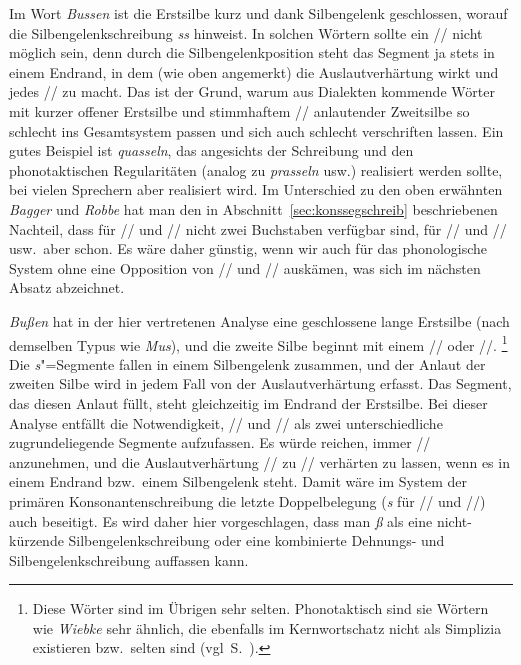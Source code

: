 Im Wort \textit{Bussen} ist die Erstsilbe kurz und dank Silbengelenk geschlossen, worauf die Silbengelenkschreibung \textit{ss} hinweist.
In solchen Wörtern sollte ein // nicht möglich sein, denn durch die Silbengelenkposition steht das Segment ja stets in einem Endrand, in dem (wie oben angemerkt) die Auslautverhärtung wirkt und jedes // zu \textipa{[s]} macht.
Das ist der Grund, warum aus Dialekten kommende Wörter mit kurzer offener Erstsilbe und stimmhaftem // anlautender Zweitsilbe so schlecht ins Gesamtsystem passen und sich auch schlecht verschriften lassen.
Ein gutes Beispiel ist \textit{quasseln}, das angesichts der Schreibung und den phonotaktischen Regularitäten (analog zu \textit{prasseln} usw.) \textipa{[kvas@ln]} realisiert werden sollte, bei vielen Sprechern aber \textipa{[kvaz@ln]} realisiert wird.
Im Unterschied zu den oben erwähnten \textit{Bagger} und \textit{Robbe} hat man den in Abschnitt~\ref{sec:konssegschreib} beschriebenen Nachteil, dass für // und // nicht zwei Buchstaben verfügbar sind, für // und // usw.\ aber schon.
Es wäre daher günstig, wenn wir auch für das phonologische System ohne eine Opposition von // und // auskämen, was sich im nächsten Absatz abzeichnet.

\textit{Bußen} hat in der hier vertretenen Analyse eine geschlossene lange Erstsilbe (nach demselben Typus wie \textit{Mus}), und die zweite Silbe beginnt mit einem // oder //.%
\footnote{Diese Wörter sind im Übrigen sehr selten.
Phonotaktisch sind sie Wörtern wie \textit{Wiebke} sehr ähnlich, die ebenfalls im Kernwortschatz nicht als Simplizia existieren bzw.\ selten sind (vgl\ S.~\pageref{abs:wiebke}).}
Die \textit{s}"=Segmente fallen in einem Silbengelenk zusammen, und der Anlaut der zweiten Silbe wird in jedem Fall von der Auslautverhärtung erfasst.
Das Segment, das diesen Anlaut füllt, steht gleichzeitig im Endrand der Erstsilbe.
Bei dieser Analyse entfällt die Notwendigkeit, // und // als zwei unterschiedliche zugrundeliegende Segmente aufzufassen.
Es würde reichen, immer // anzunehmen, und die Auslautverhärtung // zu // verhärten zu lassen, wenn es in einem Endrand bzw.\ einem Silbengelenk steht.
Damit wäre im System der primären Konsonantenschreibung die letzte Doppelbelegung (\textit{s} für // und //) auch beseitigt.
Es wird daher hier vorgeschlagen, dass man \textit{ß} als eine nicht-kürzende Silbengelenkschreibung oder eine kombinierte Dehnungs- und Silbengelenkschreibung auffassen kann.


